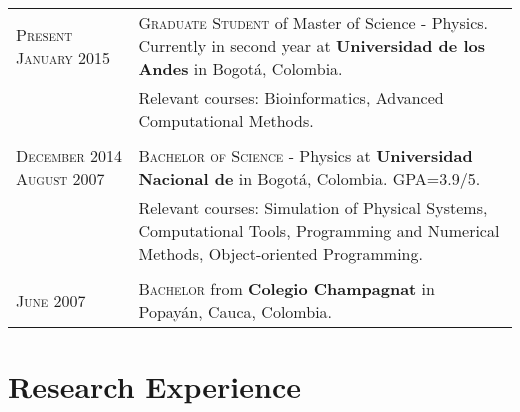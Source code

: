 \documentclass[a4paper,10pt]{article} %
\begin{document}
\begin{tabular}{p{2.7cm}p{11.4cm}}	

\textsc{Present} \newline \textsc{January 2015} & \textsc{Graduate Student} of Master of Science - Physics. Currently in second year at \textbf{Universidad de los Andes} in Bogot\'a, Colombia. \\
& Relevant courses: Bioinformatics, Advanced Computational Methods. \\
\\
\textsc{December 2014} \newline \textsc{August 2007} & \textsc{Bachelor of Science} - Physics at \textbf{Universidad Nacional de}  in Bogot\'a, Colombia. GPA=3.9/5. \\ & Relevant courses: Simulation of Physical Systems, Computational Tools, Programming and Numerical Methods, Object-oriented Programming. \\
\\
\textsc{June 2007}& \textsc{}\textsc{Bachelor} from \normalsize\textbf{Colegio Champagnat} in Popay\'an, Cauca, Colombia.
\end{tabular}


\color{OrangeRed}
\section{Research Experience}
\color{black}
\end{document}
